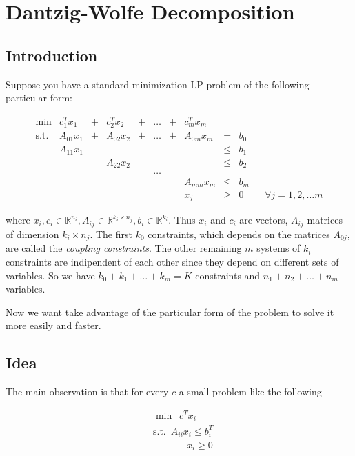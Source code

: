 \documentclass[a4paper,12pt]{article}
\begin{document}
\section{Dantzig-Wolfe Decomposition}

\subsection{Introduction}

Suppose you have a standard minimization LP problem of the following particular form:

\begin{equation}
\begin{array}{cccccccccccc}
\min& c_1^Tx_1& +& c_2^Tx_2& +& \dots& +& c_m^Tx_m& & &&\\
\text{s.t.}& A_{01}x_1& +& A_{02}x_2& +& \dots& +& A_{0m}x_m& =& b_0 && \\
& A_{11}x_1& &&&&&& \leq& b_1 &&\\
&&& A_{22}x_2& &&&& \leq& b_2 &&\\
&&&&& \dots &&&&&& \\
&&&&&&& A_{mm}x_m& \leq& b_m &&\\
&&&&&&& x_j& \geq& 0&  &\forall j = 1,2, \dots m
\end{array}
\label{eq:particularFormDantzig}
\end{equation}

where $x_i,c_i  \in \mathbb{R}^{n_i}, A_{ij} \in \mathbb{R}^{k_i \times n_j}, b_i \in \mathbb{R}^{k_i}$. Thus $x_i$ and $c_i$ are vectors, $A_{ij}$ matrices of dimension $k_i \times n_j$. The first $k_0$ constraints, which depends on the matrices $A_{0j}$, are called the \textit{coupling constraints}. The other remaining $m$ systems of $k_i$ constraints are indipendent of each other since they depend on different sets of variables. So we have $k_0 + k_1 + \dots + k_m = K$ constraints and $n_1 + n_2 + \dots + n_m $ variables.

Now we want take advantage of the particular form of the problem to solve it more easily and faster.


\subsection{Idea}

The main observation is that for every $c$ a small problem like the following 


\begin{align*}  
&\min \enspace c^{T}x_i \\
&\text{s.t.} \enspace A_{ii}x_i \leq b_i^T  \\
&\quad \enspace \qquad x_i \geq 0
\end{align*}
\end{document}
